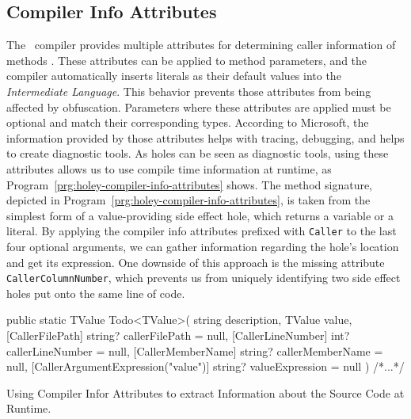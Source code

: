 \subsection{Compiler Info Attributes}
\label{sec:holey-compiler-info-attributes}
The \CS\ compiler provides multiple attributes for determining caller information of methods \cite{microsoft_attributes_2022}.
These attributes can be applied to method parameters, and the compiler automatically inserts literals as their default values into the \emph{Intermediate Language}.
This behavior prevents those attributes from being affected by obfuscation.
Parameters where these attributes are applied must be optional and match their corresponding types.
According to Microsoft, the information provided by those attributes helps with tracing, debugging, and helps to create diagnostic tools.
As holes can be seen as diagnostic tools, using these attributes allows us to use compile time information at runtime, as Program~\ref{prg:holey-compiler-info-attributes} shows.
The method signature, depicted in Program~\ref{prg:holey-compiler-info-attributes}, is taken from the simplest form of a value-providing side effect hole, which returns a variable or a literal.
By applying the compiler info attributes prefixed with \verb|Caller| to the last four optional arguments, we can gather information regarding the hole's location and get its expression.
One downside of this approach is the missing attribute \verb|CallerColumnNumber|, which prevents us from uniquely identifying two side effect holes put onto the same line of code.

\begin{program}[ht]
\begin{CsCode}
public static TValue Todo<TValue>(
	string description,
	TValue value,
	[CallerFilePath] string? callerFilePath = null,
	[CallerLineNumber] int? callerLineNumber = null,
	[CallerMemberName] string? callerMemberName = null,
	[CallerArgumentExpression("value")] string? valueExpression = null
) { /*...*/ }
\end{CsCode}
\caption{Using Compiler Infor Attributes to extract Information about the Source Code at Runtime.}
\label{prg:holey-compiler-info-attributes}
\end{program}


